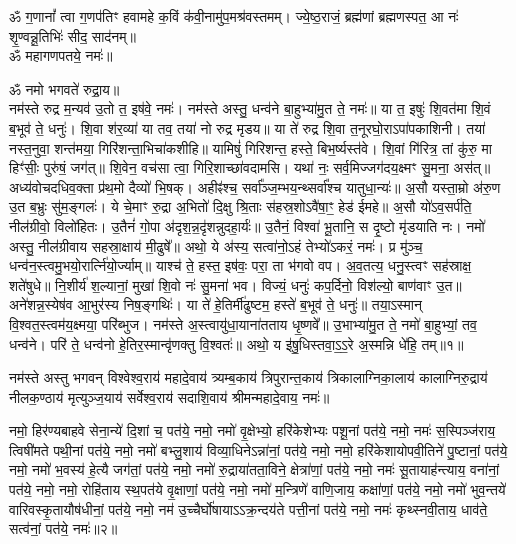 
\newpage
{}

ॐ ग॒णानां᳚ त्वा ग॒णप॑तिꣳ हवामहे क॒विं क॑वी॒नामु॑प॒मश्र॑\-वस्तमम्। 
ज्ये॒ष्ठ॒राजं॒ ब्रह्म॑णां ब्रह्मणस्पत॒ आ नः॑ शृ॒ण्वन्नू॒तिभिः॑ सीद॒ साद॑नम्॥\\
ॐ महागणपतये॒ नमः॑॥ 

ॐ नमो भगवते॑ रुद्रा॒य॥\\
 नम॑स्ते रुद्र म॒न्यव॑ उ॒तो त॒ इष॑वे॒ नमः॑। नम॑स्ते अस्तु॒ धन्व॑ने बा॒हुभ्या॑मु॒त ते॒ नमः॑॥ या त॒ इषुः॑ शि॒वत॑मा शि॒वं ब॒भूव॑ ते॒ धनुः॑। शि॒वा श॑र॒व्या॑ या तव॒ तया॑ नो रुद्र मृडय॥ या ते॑ रुद्र शि॒वा त॒नूरघो॒राऽपा॑पकाशिनी। तया॑ नस्त॒नुवा॒ शन्त॑मया॒ गिरि॑शन्ता॒\-भिचा॑कशीहि॥ यामिषुं॑ गिरिशन्त॒ हस्ते॒ बिभ॒र्ष्यस्त॑वे। शि॒वां गि॑रित्र॒ तां कु॑रु॒ मा हिꣳ॑सीः॒ पुरु॑षं॒ जग॑त्॥ शि॒वेन॒ वच॑सा त्वा॒ गिरि॒शाच्छा॑वदामसि। यथा॑ नः॒ सर्व॒मिज्जग॑दय॒क्ष्मꣳ सु॒मना॒ अस॑त्॥ अध्य॑वोचदधिव॒क्ता प्र॑थ॒मो दैव्यो॑ भि॒षक्।  अहीꣴ॑श्च॒ सर्वा᳚ञ्ज॒म्भय॒न्थ्सर्वा᳚श्च यातुधा॒न्यः॑॥ अ॒सौ यस्ता॒म्रो अ॑रु॒ण उ॒त ब॒भ्रुः सु॑म॒ङ्गलः॑। ये चे॒माꣳ रु॒द्रा अ॒भितो॑ दि॒क्षु श्रि॒ताः स॑हस्र॒शोऽवै॑षा॒ꣳ॒ हेड॑ ईमहे॥ अ॒सौ यो॑ऽव॒सर्प॑ति॒ नील॑ग्रीवो॒ विलो॑हितः। उ॒तैनं॑ गो॒पा अ॑दृश॒न्न॒दृ॑शन्नुदहा॒र्यः॑॥ उ॒तैनं॒ विश्वा॑ भू॒तानि॒ स दृ॒ष्टो मृ॑डयाति नः। नमो॑ अस्तु॒ नील॑ग्रीवाय सहस्रा॒क्षाय॑ मी॒ढुषे᳚॥ अथो॒ ये अ॑स्य॒ सत्वा॑नो॒ऽहं तेभ्यो॑ऽकरं॒ नमः॑। प्र मु॑ञ्च॒ धन्व॑न॒स्त्वमु॒भयो॒रार्त्नि॑यो॒र्ज्याम्॥ याश्च॑ ते॒ हस्त॒ इष॑वः॒ परा॒ ता भ॑गवो वप। अ॒व॒तत्य॒ धनु॒स्त्वꣳ सह॑स्राक्ष॒ शते॑षुधे॥ नि॒शीर्य॑ श॒ल्यानां॒ मुखा॑ शि॒वो नः॑ सु॒मना॑ भव। विज्यं॒ धनुः॑ कप॒र्दिनो॒ विश॑ल्यो॒ बाण॑वाꣳ उ॒त॥
 अने॑शन्न॒\-स्येष॑व आ॒भुर॑स्य निष॒ङ्गथिः॑। या ते॑ हे॒तिर्मी॑ढुष्टम॒ हस्ते॑ ब॒भूव॑ ते॒ धनुः॑॥ तया॒ऽस्मान् वि॒श्वत॒स्त्वम॑य॒क्ष्मया॒ परि॑ब्भुज। नम॑स्ते अ॒स्त्वायु॑धा॒याना॑तताय धृ॒ष्णवे᳚॥ उ॒भाभ्या॑मु॒त ते॒ नमो॑ बा॒हुभ्यां॒ तव॒ धन्व॑ने। परि॑ ते॒ धन्व॑नो हे॒तिर॒स्मान्वृ॑णक्तु वि॒श्वतः॑॥ अथो॒ य इ॑षु॒धिस्तवा॒ऽ॒ऽ॒रे अ॒स्मन्नि धे॑हि॒ तम्॥१॥

 
नम॑स्ते अस्तु भगवन् विश्वेश्व॒राय॑ महादे॒वाय॑ त्र्यम्ब॒काय॑ त्रिपुरान्त॒काय॑ त्रिकालाग्निका॒लाय॑ कालाग्निरु॒द्राय॑ नीलक॒ण्ठाय॑ मृत्युञ्ज॒याय॑ सर्वेश्व॒राय॑ सदाशि॒वाय॑ श्रीमन्महादे॒वाय॒ नमः॑॥ 

नमो॒ हिर॑ण्यबाहवे सेना॒न्ये॑ दि॒शां च॒ पत॑ये॒ नमो॒ नमो॑ वृ॒क्षेभ्यो॒ हरि॑केशेभ्यः पशू॒नां पत॑ये॒ नमो॒ नमः॑ स॒स्पिञ्ज॑राय॒ त्विषी॑मते पथी॒नां पत॑ये॒ नमो॒ नमो॑ बभ्लु॒शाय॑ विव्या॒धिने\-ऽन्ना॑नां॒ पत॑ये॒ नमो॒ नमो॒ हरि॑केशायोपवी॒तिने॑ पु॒ष्टानां॒ पत॑ये॒ नमो॒ नमो॑ भ॒वस्य॑ हे॒त्यै जग॑तां॒ पत॑ये॒ नमो॒ नमो॑ रु॒द्राया॑तता॒विने॒ क्षेत्रा॑णां॒ पत॑ये॒ नमो॒ नमः॑ सू॒तायाह॑न्त्याय॒ वना॑नां॒ पत॑ये॒ नमो॒ नमो॒ रोहि॑ताय स्थ॒पत॑ये वृ॒क्षाणां॒ पत॑ये॒ नमो॒ नमो॑ म॒न्त्रिणे॑ वाणि॒जाय॒ कक्षा॑णां॒ पत॑ये॒ नमो॒ नमो॑ भुव॒न्तये॑ वारिवस्कृ॒तायौष॑धीनां॒ पत॑ये॒ नमो॒ नम॑ उ॒च्चैर्घो॑षा\-या\-ऽऽ\-क्र॒न्दय॑ते पत्ती॒नां पत॑ये॒ नमो॒ नमः॑ कृथ्स्नवी॒ताय॒ धाव॑ते॒ सत्व॑नां॒ पत॑ये॒ नमः॑॥२॥ 


